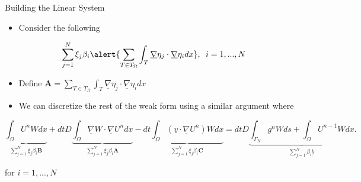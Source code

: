 \documentclass[10pt]{beamer}
\begin{document}
\begin{frame}{Building the Linear System}\label{BuildLinearSystem}
\begin{itemize}
\item Consider the following
\end{itemize}
\begin{equation}
\sum_{j=1}^{N} \xi_{j}\beta_{i}\alert{\sum_{T \in T_{\Omega}}\int_{T} \underline{\nabla} \eta_{j} \cdot \underline{\nabla}\eta_{i} dx}, \texttt{ } i=1,...,N
\end{equation}

\begin{itemize}
\item Define $\mathbf{A} = \sum_{T \in T_{\Omega}}\int_{T} \underline{\nabla} \eta_{j} \cdot \underline{\nabla}\eta_{i} dx$
\end{itemize}

\begin{itemize}
\item We can discretize the rest of the weak form using a similar argument where
\end{itemize}

\footnotesize
\begin{equation}
\underbrace{\int_{\Omega}U^{n}W dx}_{\sum_{j=1}^{N} \xi_{j}\beta_{i}\mathbf{B}} +dtD\underbrace{\int_{\Omega}\underline{\nabla}W \cdot \underline{\nabla} U^{n} dx}_{\sum_{j=1}^{N} \xi_{j}\beta_{i}\mathbf{A}}-dt\underbrace{\int_{\Omega}\left(\underline{v}\cdot \underline{\nabla}U^{n}\right)W dx}_{\sum_{j=1}^{N} \xi_{j}\beta_{i}\mathbf{C}}=dtD\underbrace{\int_{\Gamma_{N}}g^{n}W ds+ \int_{\Omega} U^{n-1}W dx}_{\sum_{j=1}^{N} \beta_{i}\underline{b}}.
\end{equation}

\normalsize
for $i=1,...,N$
\hyperlink{Questions}{}
\end{frame}
\end{document}
